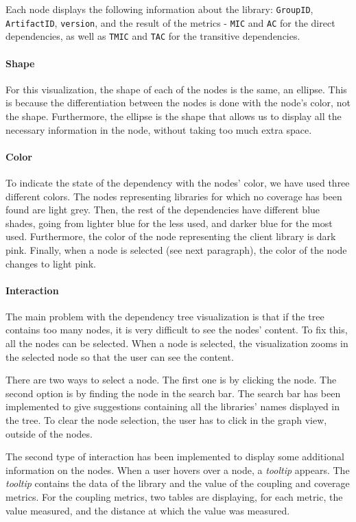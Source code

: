 Each node displays the following information about the library: \texttt{GroupID}, \texttt{ArtifactID}, \texttt{version}, and the result of the metrics - \texttt{MIC} and \texttt{AC} for the direct dependencies, as well as \texttt{TMIC} and \texttt{TAC} for the transitive dependencies.

\paragraph{Shape}
For this visualization, the shape of each of the nodes is the same, an ellipse. This is because the differentiation between the nodes is done with the node's color, not the shape. Furthermore, the ellipse is the shape that allows us to display all the necessary information in the node, without taking too much extra space.

\paragraph{Color}
To indicate the state of the dependency with the nodes' color, we have used three different colors. The nodes representing libraries for which no coverage has been found are light grey. Then, the rest of the dependencies have different blue shades, going from lighter blue for the less used, and darker blue for the most used. Furthermore, the color of the node representing the client library is dark pink. Finally, when a node is selected (see next paragraph), the color of the node changes to light pink.

\paragraph{Interaction}
The main problem with the dependency tree visualization is that if the tree contains too many nodes, it is very difficult to see the nodes' content. To fix this, all the nodes can be selected. When a node is selected, the visualization zooms in the selected node so that the user can see the content.

There are two ways to select a node. The first one is by clicking the node. The second option is by finding the node in the search bar. The search bar has been implemented to give suggestions containing all the libraries' names displayed in the tree. To clear the node selection, the user has to click in the graph view, outside of the nodes.

The second type of interaction has been implemented to display some additional information on the nodes. When a user hovers over a node, a \textit{tooltip} appears. The \textit{tooltip} contains the data of the library and the value of the coupling and coverage metrics. For the coupling metrics, two tables are displaying, for each metric, the value measured, and the distance at which the value was measured.

